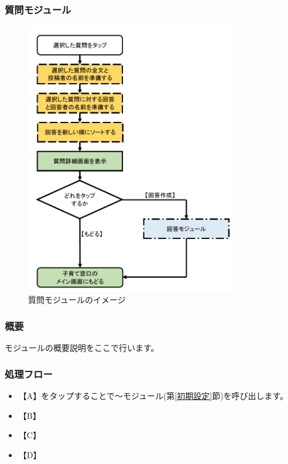 \documentclass[a4j]{jarticle}
\begin{document}
\subsubsection{質問モジュール\label{質問}} %
\begin{figure}[H]
    \begin{center}
      \includegraphics[height = 12.0cm] {子育て窓口_質問.PNG} %
    \caption {質問モジュールのイメージ}
    \label{functionselection}
    \end{center}
\end{figure}
\subsubsection*{概要}
モジュールの概要説明をここで行います。
\subsubsection*{処理フロー}
\begin{itemize}
\item 【A】をタップすることで～モジュール(第\ref{初期設定}節)を呼び出します。%
\item 【B】
\item 【C】
\item 【D】
\end{itemize}
\end{document}
